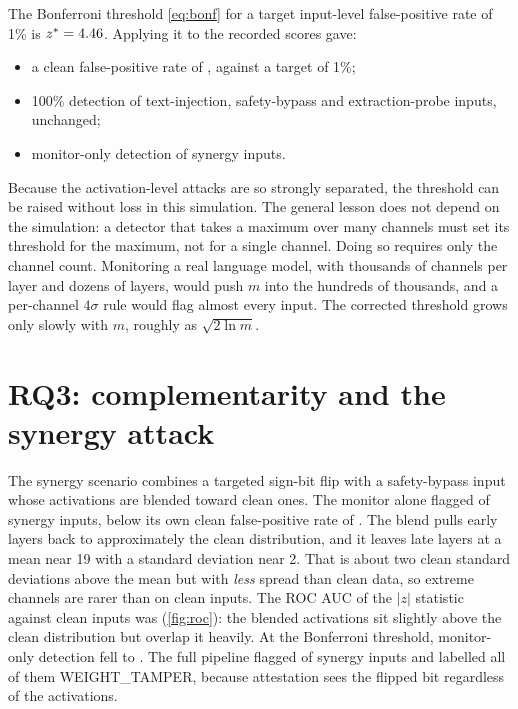 The Bonferroni threshold \cref{eq:bonf} for a target input-level false-positive rate of 1\% is
$z^*=4.46$. Applying it to the recorded scores gave:

\begin{itemize}[leftmargin=*]
  \item a clean false-positive rate of \EmpFPRBonf{}, against a target of 1\%;
  \item 100\% detection of text-injection, safety-bypass and extraction-probe inputs, unchanged;
  \item \SynergyTPRBonf{} monitor-only detection of synergy inputs.
\end{itemize}

Because the activation-level attacks are so strongly separated, the threshold can be raised
without loss in this simulation. The general lesson does not depend on the simulation: a
detector that takes a maximum over many channels must set its threshold for the maximum, not for
a single channel. Doing so requires only the channel count. Monitoring a real language model,
with thousands of channels per layer and dozens of layers, would push $m$ into the hundreds of
thousands, and a per-channel $4\sigma$ rule would flag almost every input. The corrected threshold
grows only slowly with $m$, roughly as $\sqrt{2\ln m}$.

\section{RQ3: complementarity and the synergy attack}
\label{sec:eval:synergy}

The synergy scenario combines a targeted sign-bit flip with a safety-bypass input whose
activations are blended toward clean ones. The monitor alone flagged \MonSynergy{} of synergy
inputs, below its own clean false-positive rate of \MonClean{}. The blend pulls early layers back
to approximately the clean distribution, and it leaves late layers at a mean near 19 with a
standard deviation near 2. That is about two clean standard deviations above the mean but with
\emph{less} spread than clean data, so extreme channels are rarer than on clean inputs. The ROC AUC of the $|z|$ statistic against clean inputs was \AUCSynergy{}
(\cref{fig:roc}): the blended activations sit slightly above the clean distribution but overlap
it heavily. At the Bonferroni threshold, monitor-only detection fell to \SynergyTPRBonf{}. The
full pipeline flagged \FlagSynergy{} of synergy inputs and labelled all of them WEIGHT\_TAMPER,
because attestation sees the flipped bit regardless of the activations.

